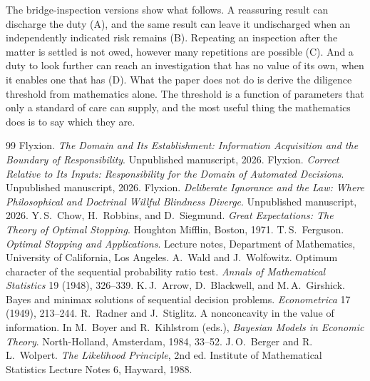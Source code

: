 \documentclass[11pt]{article}
\theoremstyle{plain}
\theoremstyle{definition}
\begin{document}
The bridge-inspection versions show what follows. A reassuring result can discharge the duty (A), and the same result can leave it undischarged when an independently indicated risk remains (B). Repeating an inspection after the matter is settled is not owed, however many repetitions are possible (C). And a duty to look further can reach an investigation that has no value of its own, when it enables one that has (D). What the paper does not do is derive the diligence threshold from mathematics alone. The threshold is a function of parameters that only a standard of care can supply, and the most useful thing the mathematics does is to say which they are.

\begin{thebibliography}{99}
 Flyxion. \emph{The Domain and Its Establishment: Information Acquisition and the Boundary of Responsibility}. Unpublished manuscript, 2026.
 Flyxion. \emph{Correct Relative to Its Inputs: Responsibility for the Domain of Automated Decisions}. Unpublished manuscript, 2026.
 Flyxion. \emph{Deliberate Ignorance and the Law: Where Philosophical and Doctrinal Willful Blindness Diverge}. Unpublished manuscript, 2026.
 Y.\,S.\ Chow, H.\ Robbins, and D.\ Siegmund. \emph{Great Expectations: The Theory of Optimal Stopping}. Houghton Mifflin, Boston, 1971.
 T.\,S.\ Ferguson. \emph{Optimal Stopping and Applications}. Lecture notes, Department of Mathematics, University of California, Los Angeles.
 A.\ Wald and J.\ Wolfowitz. Optimum character of the sequential probability ratio test. \emph{Annals of Mathematical Statistics} 19 (1948), 326--339.
 K.\,J.\ Arrow, D.\ Blackwell, and M.\,A.\ Girshick. Bayes and minimax solutions of sequential decision problems. \emph{Econometrica} 17 (1949), 213--244.
 R.\ Radner and J.\ Stiglitz. A nonconcavity in the value of information. In M.\ Boyer and R.\ Kihlstrom (eds.), \emph{Bayesian Models in Economic Theory}. North-Holland, Amsterdam, 1984, 33--52.
 J.\,O.\ Berger and R.\,L.\ Wolpert. \emph{The Likelihood Principle}, 2nd ed. Institute of Mathematical Statistics Lecture Notes 6, Hayward, 1988.
\end{thebibliography}
\end{document}
